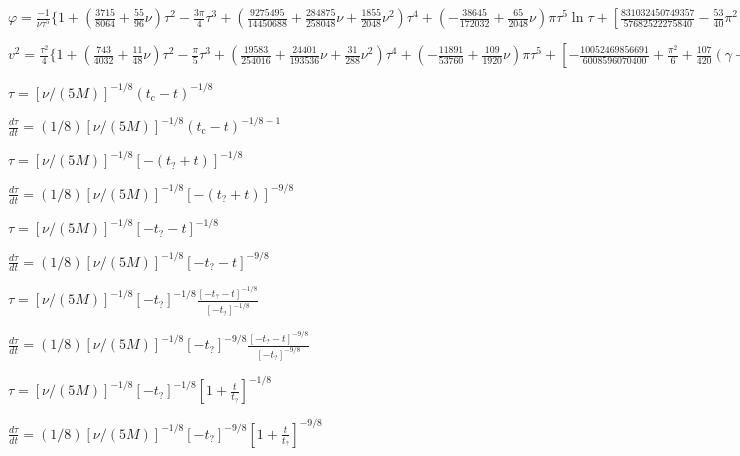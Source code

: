 \documentclass[a3paper]{ctexart}
\begin{document}
$\varphi=\frac{-1}{\nu\tau^{5}}\{1+(\frac{3715}{8064}+\frac{55}{96}\nu)\tau^{2}-\frac{3\pi}{4}\tau^{3}+(\frac{9275495}{14450688}+\frac{284875}{258048}\nu+\frac{1855}{2048}\nu^{2})\tau^{4}+(-\frac{38645}{172032}+\frac{65}{2048}\nu)\pi\tau^{5}\ln\tau+[\frac{831032450749357}{57682522275840}-\frac{53}{40}\pi^{2}-\frac{107}{56}(\gamma+\ln(2\tau))+(-\frac{126510089885}{4161798144}+\frac{2255}{2048}\pi^{2})\nu+\frac{154565}{1835008}\nu^{2}-\frac{1179625}{1769472}\nu^{3}]\tau^{6}+(\frac{188516689}{173408256}+\frac{488825}{516096}\nu-\frac{141769}{516096}\nu^{2})\pi\tau^{7}\}$

$v^{2}=\frac{\tau^{2}}{4}\{1+(\frac{743}{4032}+\frac{11}{48}\nu)\tau^{2}-\frac{\pi}{5}\tau^{3}+(\frac{19583}{254016}+\frac{24401}{193536}\nu+\frac{31}{288}\nu^{2})\tau^{4}+(-\frac{11891}{53760}+\frac{109}{1920}\nu)\pi\tau^{5}+[-\frac{10052469856691}{6008596070400}+\frac{\pi^{2}}{6}+\frac{107}{420}(\gamma+\ln{2\tau})+(\frac{3147553127}{780337152}-\frac{451}{3072}\pi^{2})\nu-\frac{15211}{442368}\nu^{2}+\frac{25565}{331776}\nu^{3}]\tau^{6}+(-\frac{113868647}{433520640}-\frac{31821}{143360}\nu+\frac{294941}{3870720}\nu^{2})\pi\tau^{7}\}$

$\tau=[\nu/(5M)]^{-1/8}(t_\text{c}-t)^{-1/8}$

$\frac{d\tau}{d t}=(1/8)[\nu/(5M)]^{-1/8}(t_\text{c}-t)^{-1/8-1}$

$\tau=[\nu/(5M)]^{-1/8}[-(t_?+t)]^{-1/8}$

$\frac{d\tau}{d t}=(1/8)[\nu/(5M)]^{-1/8}[-(t_?+t)]^{-9/8}$

$\tau=[\nu/(5M)]^{-1/8}[-t_?-t]^{-1/8}$

$\frac{d\tau}{d t}=(1/8)[\nu/(5M)]^{-1/8}[-t_?-t]^{-9/8}$

$\tau=[\nu/(5M)]^{-1/8}[-t_?]^{-1/8}\frac{[-t_?-t]^{-1/8}}{[-t_?]^{-1/8}}$

$\frac{d\tau}{d t}=(1/8)[\nu/(5M)]^{-1/8}[-t_?]^{-9/8}\frac{[-t_?-t]^{-9/8}}{[-t_?]^{-9/8}}$

$\tau=[\nu/(5M)]^{-1/8}[-t_?]^{-1/8}[1+\frac{t}{t_?}]^{-1/8}$

$\frac{d\tau}{d t}=(1/8)[\nu/(5M)]^{-1/8}[-t_?]^{-9/8}[1+\frac{t}{t_?}]^{-9/8}$
\end{document}
